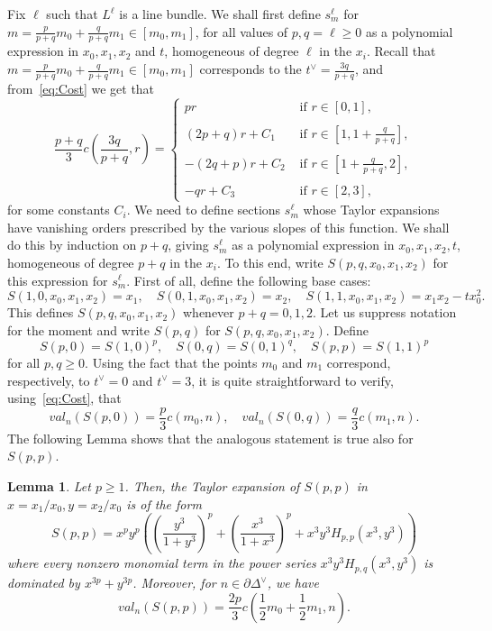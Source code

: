 \documentclass{article}
\newtheorem{lemma}{Lemma}
\begin{document}
Fix $\ell$ such that $L^\ell$ is a line bundle. We shall first define $s^\ell_m$ for $m=\frac{p}{p+q}m_0+\frac{q}{p+q}m_1 \in[m_0,m_1]$, for all values of $p,q =\ell \geq0$ as a polynomial expression in $x_0,x_1,x_2$ and $t$, homogeneous of degree $\ell$ in the $x_i$. Recall that $m=\frac{p}{p+q}m_0+\frac{q}{p+q}m_1 \in[m_0,m_1]$ corresponds to the $t^\vee = \frac{3q}{p+q}$, and from~\eqref{eq:Cost} we get that
\begin{equation}\label{eq:VanishingOrders}
    \frac{p+q}{3}c\left(\frac{3q}{p+q},r\right) = 
    \begin{cases}
        pr & \textrm{ if } r\in[0,1],\\
        \\
        (2p+q)r + C_1 & \textrm{ if } r\in [1,1+\frac{q}{p+q}],\\
        \\
        -(2q+p)r + C_2 & \textrm{ if } r\in[1+\frac{q}{p+q},2],\\
        \\
        -qr +C_3& \textrm{ if } r\in[2,3],
    \end{cases}
    \end{equation}
    for some constants $C_i$. 
We need to define sections $s^\ell_m$ whose Taylor expansions have vanishing orders prescribed by the various slopes of this function. We shall do this by induction on $p+q$, giving $s^\ell_m$ as a polynomial expression in $x_0,x_1,x_2, t$, homogeneous of degree $p+q$ in the $x_i$. To this end, write $S(p,q,x_0,x_1,x_2)$ for this expression for $s^\ell_m$. First of all, define the following base cases:
\[
S(1,0,x_0,x_1,x_2) = x_1, \quad S(0,1,x_0,x_1,x_2) = x_2, \quad S(1,1,x_0,x_1,x_2) = x_1x_2-tx_0^2.
\] 
This defines $S(p,q,x_0,x_1,x_2)$ whenever $p+q = 0,1,2$. Let us suppress notation for the moment and write $S(p,q)$ for $S(p,q,x_0,x_1,x_2)$. 
Define 
\begin{equation}\label{eq:BaseCases}
    S(p,0)=S(1,0)^p,\quad S(0,q)= S(0,1)^q, \quad S(p,p)=S(1,1)^p
\end{equation}
for all $p,q\geq 0$. Using the fact that the points $m_0$ and $m_1$ correspond, respectively, to $t^\vee=0$ and $t^\vee=3$, it is quite straightforward to verify, using~\eqref{eq:Cost}, that 
\[
val_n(S(p,0)) = \frac{p}{3}c(m_0,n), \quad val_n(S(0,q))=\frac{q}{3}c(m_1,n).
\]
The following Lemma shows that the analogous statement is true also for $S(p,p)$. 
\begin{lemma}\label{lemma:EqualityCase}
    Let $p\geq1$. Then, the Taylor expansion of $S(p,p)$ in $x=x_1/x_0,y=x_2/x_0$ is of the form 
    \[
    S(p,p) = x^py^p\left(\left(\frac{y^3}{1+y^3}\right)^p + \left(\frac{x^3}{1+x^3}\right)^p + x^3y^3H_{p,p}(x^3,y^3)\right)
    \]
where every  nonzero monomial term in the power series $x^3y^3H_{p,q}(x^3,y^3)$ is dominated by $x^{3p}+y^{3p}$. Moreover, for $n\in\partial\Delta^\vee$, we have 
\[
val_n(S(p,p))=\frac{2p}{3}c(\frac{1}{2}m_0+\frac{1}{2}m_1,n).
\]
\end{lemma}
\end{document}
